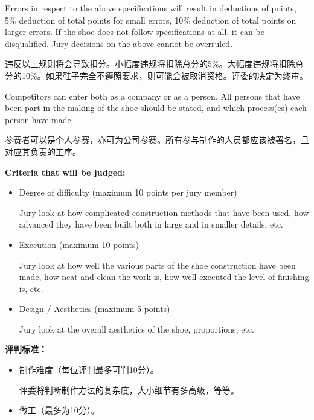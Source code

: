 \begin{paracol}{2}
        Errors in respect to the above specifications will result in deductions of points, 5\% deduction of total points for small errors, 10\% deduction of total points on larger errors. If the shoe does not follow specifications at all, it can be disqualified. Jury decisions on the above cannot be overruled.

        \switchcolumn
        违反以上规则将会导致扣分。小幅度违规将扣除总分的5\%。大幅度违规将扣除总分的10\%。如果鞋子完全不遵照要求，则可能会被取消资格。评委的决定为终审。
        \switchcolumn*

        Competitors can enter both as a company or as a person. All persons that have been part in the making of the shoe should be stated, and which process(es) each person have made.

        \vspace{1em}

        \switchcolumn
        参赛者可以是个人参赛，亦可为公司参赛。所有参与制作的人员都应该被署名，且对应其负责的工序。
        \switchcolumn*

        \textbf{Criteria that will be judged:}
        \begin{itemize}
            \item Degree of difficulty (maximum 10 points per jury member)

            Jury look at how complicated construction methods that have been used, how advanced they have been built both in large and in smaller details, etc.

            \item Execution (maximum 10 points)

            Jury look at how well the various parts of the shoe construction have been made, how neat and clean the work is, how well executed the level of finishing is, etc.

            \item Design / Aesthetics (maximum 5 points)

            Jury look at the overall aesthetics of the shoe, proportions, etc.
        \end{itemize}

        \switchcolumn
        \textbf{评判标准：}
        \begin{itemize}
            \item 制作难度（每位评判最多可判10分）。

            评委将判断制作方法的复杂度，大小细节有多高级，等等。

            \item 做工（最多为10分）。


\end{itemize}
\end{paracol}
